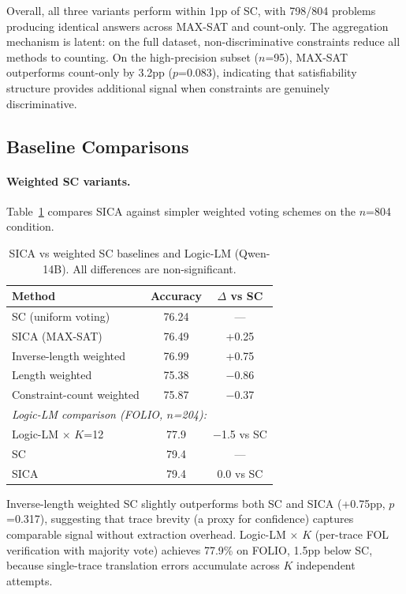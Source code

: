 \documentclass[11pt,a4paper]{article}
\begin{document}
Overall, all three variants perform within 1pp of SC, with 798/804 problems producing identical answers across MAX-SAT and count-only. The aggregation mechanism is latent: on the full dataset, non-discriminative constraints reduce all methods to counting. On the high-precision subset ($n$=95), MAX-SAT outperforms count-only by 3.2pp ($p$=0.083), indicating that satisfiability structure provides additional signal when constraints are genuinely discriminative.

\subsection{Baseline Comparisons}

\paragraph{Weighted SC variants.} Table~\ref{tab:baselines} compares SICA against simpler weighted voting schemes on the $n$=804 condition.

\begin{table}[t]
\centering
\caption{SICA vs weighted SC baselines and Logic-LM (Qwen-14B). All differences are non-significant.}
\label{tab:baselines}
\small
\begin{tabular}{lcc}
\toprule
\textbf{Method} & \textbf{Accuracy} & \textbf{$\Delta$ vs SC} \\
\midrule
SC (uniform voting) & 76.24 & --- \\
SICA (MAX-SAT) & 76.49 & +0.25 \\
Inverse-length weighted & 76.99 & +0.75 \\
Length weighted & 75.38 & $-$0.86 \\
Constraint-count weighted & 75.87 & $-$0.37 \\
\midrule
\multicolumn{3}{l}{\textit{Logic-LM comparison (FOLIO, $n$=204):}} \\
Logic-LM $\times$ $K$=12 & 77.9 & $-$1.5 vs SC \\
SC & 79.4 & --- \\
SICA & 79.4 & 0.0 vs SC \\
\bottomrule
\end{tabular}
\end{table}

Inverse-length weighted SC slightly outperforms both SC and SICA (+0.75pp, $p$=0.317), suggesting that trace brevity (a proxy for confidence) captures comparable signal without extraction overhead. Logic-LM $\times$ $K$ (per-trace FOL verification with majority vote) achieves 77.9\% on FOLIO, 1.5pp below SC, because single-trace translation errors accumulate across $K$ independent attempts.
\end{document}
